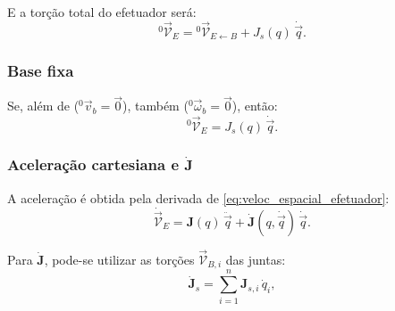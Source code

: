 E a torção total do efetuador será:
\begin{equation}
\label{eq:jac_base_particular2}
{}^{0}\!\vec{\mathcal V}_{E}=
{}^{0}\!\vec{\mathcal V}_{E \leftarrow B}
+J_s(q)\,\dot{\vec{q}}.
\end{equation}

\subsubsection{Base fixa}
Se, além de
(${}^{0}\!\vec v_b=\vec 0$),
também (${}^{0}\!\vec\omega_b=\vec 0$), então:
\begin{equation}
\label{eq:VE_base_fixa}
{}^{0}\!\vec{\mathcal V}_E = J_s(q)\,\dot{\vec q}.
\end{equation}



\subsubsection{Aceleração cartesiana e \(\dot{\mathbf J}\)}
A aceleração é obtida pela derivada de \eqref{eq:veloc_espacial_efetuador}:
\begin{equation}
\dot{\vec{\mathcal V}}_E=
\mathbf J(q)\,\ddot{\vec q}+\dot{\mathbf J}(q,\dot{\vec q})\,\dot{\vec q}.
\end{equation}

Para $\dot{\mathbf J}$, pode-se utilizar as torções $\vec{\mathcal V}_{B,i}$ das juntas:
\begin{equation}
\dot{\mathbf J}_s=
\sum_{i=1}^n \mathbf J_{s,i}\,\dot q_i,
\end{equation}

